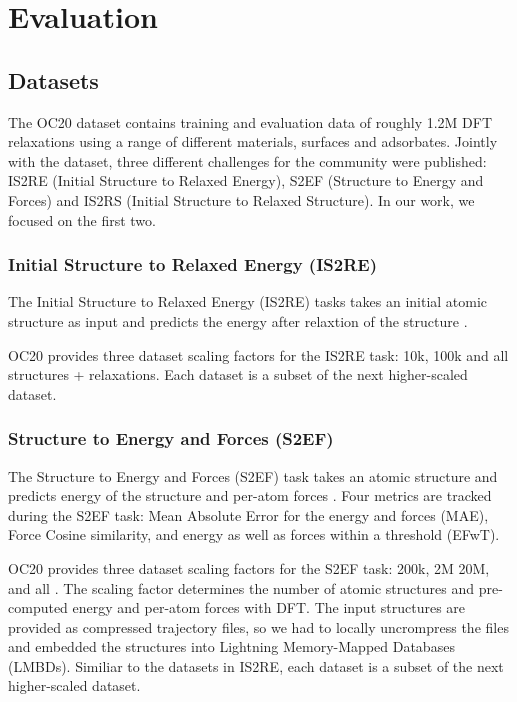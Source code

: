 \section{Evaluation}
\label{section:evaluation}

\subsection{Datasets}

The OC20 dataset \cite{Chanussot_2021} contains training and evaluation data of roughly 
1.2M DFT relaxations using a range of different materials, surfaces and adsorbates. 
Jointly with the dataset, three different challenges for the community were published:
IS2RE (Initial Structure to Relaxed Energy), S2EF (Structure to Energy and Forces) and
IS2RS (Initial Structure to Relaxed Structure). In our work, we focused on the first two.

\subsubsection{Initial Structure to Relaxed Energy (IS2RE)}

The Initial Structure to Relaxed Energy (IS2RE) tasks takes an initial atomic 
structure as input and predicts the energy after relaxtion of the structure 
\cite*{Chanussot_2021, https://doi.org/10.48550/arxiv.2206.08917}. 


OC20 provides three dataset scaling factors for the IS2RE task: 10k, 100k and 
all structures + relaxations. Each dataset is a subset of the next higher-scaled 
dataset.

\subsubsection{Structure to Energy and Forces (S2EF)}

The Structure to Energy and Forces (S2EF) task takes an atomic structure and 
predicts energy of the structure and per-atom forces 
\cite*{Chanussot_2021, https://doi.org/10.48550/arxiv.2206.08917}. Four metrics 
are tracked during the S2EF task: Mean Absolute Error for the energy and forces 
(MAE), Force Cosine similarity, and energy as well as forces within a threshold 
(EFwT). 

OC20 provides three dataset scaling factors for the S2EF task: 200k, 2M 20M,  
and all . The scaling factor determines the number of atomic structures and 
pre-computed energy and per-atom forces with DFT. The input structures are 
provided as compressed trajectory files, so we had to locally uncrompress the 
files and embedded the structures into Lightning Memory-Mapped Databases (LMBDs). 
Similiar to the datasets in IS2RE, each dataset is a subset of the next 
higher-scaled dataset. 